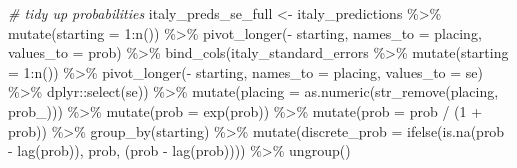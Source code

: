 \documentclass[
]{book}
\newenvironment{Shaded}{\begin{snugshade}}{\end{snugshade}}
\newcommand{\AttributeTok}[1]{\textcolor[rgb]{0.77,0.63,0.00}{#1}}
\newcommand{\CommentTok}[1]{\textcolor[rgb]{0.56,0.35,0.01}{\textit{#1}}}
\newcommand{\DecValTok}[1]{\textcolor[rgb]{0.00,0.00,0.81}{#1}}
\newcommand{\FunctionTok}[1]{\textcolor[rgb]{0.00,0.00,0.00}{#1}}
\newcommand{\NormalTok}[1]{#1}
\newcommand{\OtherTok}[1]{\textcolor[rgb]{0.56,0.35,0.01}{#1}}
\newcommand{\SpecialCharTok}[1]{\textcolor[rgb]{0.00,0.00,0.00}{#1}}
\newcommand{\StringTok}[1]{\textcolor[rgb]{0.31,0.60,0.02}{#1}}
\begin{document}
\begin{Shaded}
\begin{Highlighting}[]
\CommentTok{\# tidy up probabilities}
\NormalTok{italy\_preds\_se\_full }\OtherTok{\textless{}{-}}\NormalTok{ italy\_predictions }\SpecialCharTok{\%\textgreater{}\%}
  \FunctionTok{mutate}\NormalTok{(}\AttributeTok{starting =} \DecValTok{1}\SpecialCharTok{:}\FunctionTok{n}\NormalTok{()) }\SpecialCharTok{\%\textgreater{}\%}
  \FunctionTok{pivot\_longer}\NormalTok{(}\SpecialCharTok{{-}}\NormalTok{ starting, }\AttributeTok{names\_to =} \StringTok{\textquotesingle{}placing\textquotesingle{}}\NormalTok{, }\AttributeTok{values\_to =} \StringTok{\textquotesingle{}prob\textquotesingle{}}\NormalTok{) }\SpecialCharTok{\%\textgreater{}\%} 
  \FunctionTok{bind\_cols}\NormalTok{(italy\_standard\_errors }\SpecialCharTok{\%\textgreater{}\%} \FunctionTok{mutate}\NormalTok{(}\AttributeTok{starting =} \DecValTok{1}\SpecialCharTok{:}\FunctionTok{n}\NormalTok{()) }\SpecialCharTok{\%\textgreater{}\%}
  \FunctionTok{pivot\_longer}\NormalTok{(}\SpecialCharTok{{-}}\NormalTok{ starting, }\AttributeTok{names\_to =} \StringTok{\textquotesingle{}placing\textquotesingle{}}\NormalTok{, }\AttributeTok{values\_to =} \StringTok{\textquotesingle{}se\textquotesingle{}}\NormalTok{) }\SpecialCharTok{\%\textgreater{}\%}
\NormalTok{    dplyr}\SpecialCharTok{::}\FunctionTok{select}\NormalTok{(se)) }\SpecialCharTok{\%\textgreater{}\%}
  \FunctionTok{mutate}\NormalTok{(}\AttributeTok{placing =} \FunctionTok{as.numeric}\NormalTok{(}\FunctionTok{str\_remove}\NormalTok{(placing, }\StringTok{\textquotesingle{}prob\_\textquotesingle{}}\NormalTok{))) }\SpecialCharTok{\%\textgreater{}\%}
  \FunctionTok{mutate}\NormalTok{(}\AttributeTok{prob =} \FunctionTok{exp}\NormalTok{(prob)) }\SpecialCharTok{\%\textgreater{}\%}
  \FunctionTok{mutate}\NormalTok{(}\AttributeTok{prob =}\NormalTok{ prob }\SpecialCharTok{/}\NormalTok{ (}\DecValTok{1} \SpecialCharTok{+}\NormalTok{ prob)) }\SpecialCharTok{\%\textgreater{}\%}
  \FunctionTok{group\_by}\NormalTok{(starting) }\SpecialCharTok{\%\textgreater{}\%} 
  \FunctionTok{mutate}\NormalTok{(}\AttributeTok{discrete\_prob =} \FunctionTok{ifelse}\NormalTok{(}\FunctionTok{is.na}\NormalTok{(prob }\SpecialCharTok{{-}} \FunctionTok{lag}\NormalTok{(prob)), prob, (prob }\SpecialCharTok{{-}} \FunctionTok{lag}\NormalTok{(prob)))) }\SpecialCharTok{\%\textgreater{}\%}
  \FunctionTok{ungroup}\NormalTok{()}


\end{Highlighting}
\end{Shaded}
\end{document}
